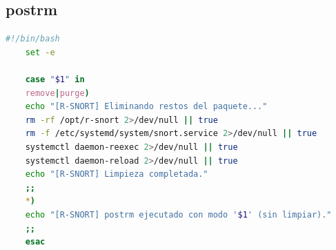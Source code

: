 \documentclass[11pt,a4paper,twoside]{report}
\begin{document}
\subsection*{postrm}
\begin{lstlisting}[language=bash, caption={Script \texttt{postrm}}, label={lst:postrm}]
	#!/bin/bash
	set -e
	
	case "$1" in
	remove|purge)
	echo "[R-SNORT] Eliminando restos del paquete..."
	rm -rf /opt/r-snort 2>/dev/null || true
	rm -f /etc/systemd/system/snort.service 2>/dev/null || true
	systemctl daemon-reexec 2>/dev/null || true
	systemctl daemon-reload 2>/dev/null || true
	echo "[R-SNORT] Limpieza completada."
	;;
	*)
	echo "[R-SNORT] postrm ejecutado con modo '$1' (sin limpiar)."
	;;
	esac
\end{lstlisting}
\end{document}
